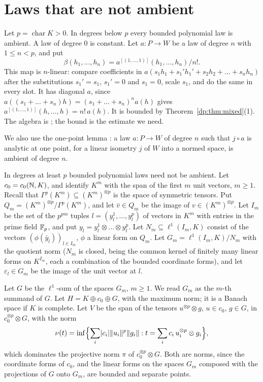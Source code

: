 \section{Laws that are not ambient}\label{dp:sec:nonambient}\label{sec:dp}

Let $p=\operatorname{char}K>0$. In degrees below $p$ every bounded polynomial law is ambient. A law of degree $0$ is constant. Let $a\colon P\to W$ be a law of degree $n$ with $1\le n<p$, and put
\[
 \beta(h_1,\dots,h_n)=a^{[(1,\dots,1)]}(h_1,\dots,h_n)/n!.
\]
This map is $n$\nobreakdash-linear: compare coefficients in $a(s_1h_1+s_1'h_1'+s_2h_2+\dots+s_nh_n)$ after the substitutions $s_1'=s_1$, $s_1'=0$ and $s_1=0$, scale $s_1$, and do the same in every slot. It has diagonal $a$, since $a((s_1+\dots+s_n)h)=(s_1+\dots+s_n)^na(h)$ gives $a^{[(1,\dots,1)]}(h,\dots,h)=n!\,a(h)$. It is bounded by Theorem~\ref{dp:thm:mixed}(1). The algebra is \cite[Th.~II.1]{Ro}; the bound is the estimate we need.

We also use the one-point lemma \cite[Proposition~14.9(2)]{I}: a law $a\colon P\to W$ of degree $n$ such that $j\circ a$ is analytic at one point, for a linear isometry $j$ of $W$ into a normed space, is ambient of degree $n$.

In degrees at least $p$ bounded polynomial laws need not be ambient. Let $c_0=c_0(\mathbb N,K)$, and identify $K^m$ with the span of the first $m$ unit vectors, $m\ge1$. Recall that $\Gamma^p(K^m)\subseteq(K^m)^{\otimes p}$ is the space of symmetric tensors. Put $Q_m=(K^m)^{\otimes p}/\Gamma^p(K^m)$, and let $\bar v\in Q_m$ be the image of $v\in(K^m)^{\otimes p}$. Let $I_m$ be the set of the $p^{pm}$ tuples $l=(y_l^1,\dots,y_l^p)$ of vectors in $K^m$ with entries in the prime field $\mathbb F_p$, and put $y_l=y_l^1\otimes\dots\otimes y_l^p$. Let $N_m\subseteq\ell^1(I_m,K)$ consist of the vectors $(\phi(\bar y_l))_{l\in I_m}$, $\phi$ a linear form on $Q_m$. Let $G_m=\ell^1(I_m,K)/N_m$ with the quotient norm ($N_m$ is closed, being the common kernel of finitely many linear forms on $K^{I_m}$, each a combination of the bounded coordinate forms), and let $\varepsilon_l\in G_m$ be the image of the unit vector at $l$.

Let $G$ be the $\ell^1$-sum of the spaces $G_m$, $m\ge1$. We read $G_m$ as the $m$-th summand of $G$. Let $H=K\oplus c_0\oplus G$, with the maximum norm; it is a Banach space if $K$ is complete. Let $V$ be the span of the tensors $u^{\otimes p}\otimes g$, $u\in c_0$, $g\in G$, in $c_0^{\otimes p}\otimes G$, with the norm
\[
 \nu(t)=\inf\Bigl\{\sum_i\lvert c_i\rvert\lVert u_i\rVert^p\lVert g_i\rVert:t=\sum_ic_i\,u_i^{\otimes p}\otimes g_i\Bigr\},
\]
which dominates the projective norm $\pi$ of $c_0^{\otimes p}\otimes G$. Both are norms, since the coordinate forms of $c_0$, and the linear forms on the spaces $G_m$ composed with the projections of $G$ onto $G_m$, are bounded and separate points.

